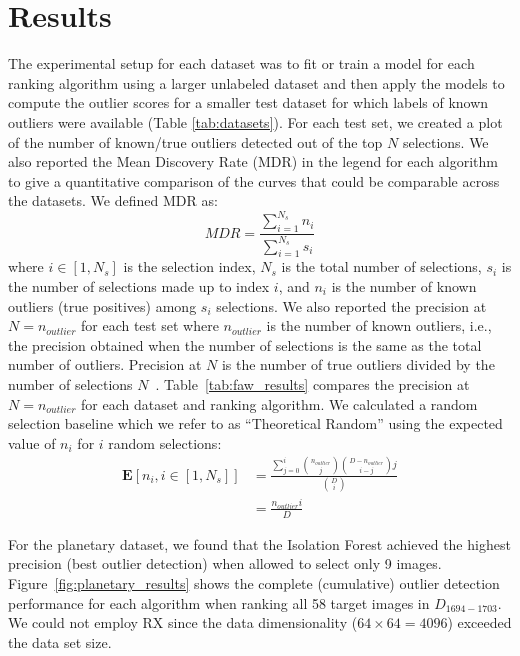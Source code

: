 \documentclass[letterpaper]{article} %
\newcommand{\todo}[1]{\textcolor{blue}{#1}}
\begin{document}
\section{Results}
The experimental setup for each dataset was to fit or train a model for
each ranking algorithm using a larger unlabeled dataset and then apply 
the models to compute the outlier scores for a smaller test dataset for which
labels of known outliers were available (Table \ref{tab:datasets}). 
For each test set, we created a plot of the number of known/true outliers 
detected out of the top $N$ selections. We also 
reported the Mean Discovery Rate (MDR) in the legend
for each algorithm to give a quantitative comparison of the curves that could
be comparable across the datasets. We defined MDR as:
\begin{equation}
MDR = \frac{\sum^{N_s}_{i=1} n_i}{\sum^{N_s}_{i=1} s_i}
\end{equation}
where $i \in [1, N_s]$ is the selection index,
 $N_s$ is the total number of selections,
 $s_i$ is the number of selections made up to index $i$,
 and $n_i$ is the number of known outliers (true positives)
among $s_i$ selections.
We also reported the precision at $N=n_{outlier}$ for each test set where
$n_{outlier}$ is the number of known outliers, i.e.,  the precision obtained 
when the number of selections is the same as the total number of outliers. 
Precision at $N$ is the number of true outliers divided by the number of 
selections $N$~\citep{campos2016evaluation}.
Table~\ref{tab:faw_results} compares the precision at $N=n_{outlier}$ for
each dataset and ranking algorithm. 
We calculated a random selection baseline which we refer to as ``Theoretical
Random'' using the expected value of $n_i$ for $i$ random selections:
\begin{align}
\mathbf{E}[n_i, i \in[1, N_s]] &= \frac{\sum^i_{j=0} {n_{outlier}\choose j} {D-n_{outlier}\choose i-j} j}{{D\choose i}} \\
&= \frac{n_{outlier}i}{D}
\end{align}

%

For the planetary dataset, we found that
the Isolation Forest achieved the highest precision (best outlier
detection) when allowed to select only \num{9} images.
Figure~\ref{fig:planetary_results} shows the complete (cumulative)
outlier detection performance for each algorithm when ranking
all \num{58} target images in $D_{1694-1703}$. We could not
employ RX since the data dimensionality ($64 \times 64 =
4096$) exceeded the data set size. 
\end{document}
